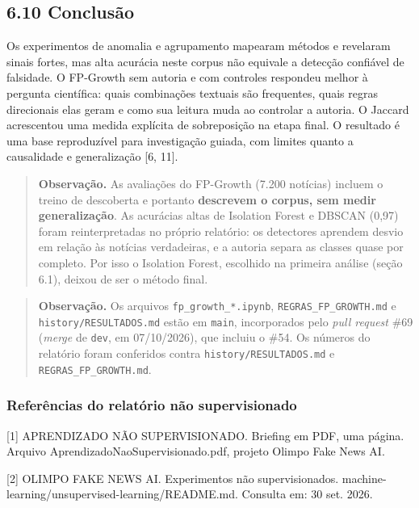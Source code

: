 \documentclass[
  brazilian,
  11pt,
]{article}
\begin{document}
\subsection{6.10 Conclusão}\label{conclusuxe3o}

Os experimentos de anomalia e agrupamento mapearam métodos e revelaram sinais fortes, mas alta acurácia neste corpus não equivale a detecção confiável de falsidade. O FP-Growth sem autoria e com controles respondeu melhor à pergunta científica: quais combinações textuais são frequentes, quais regras direcionais elas geram e como sua leitura muda ao controlar a autoria. O Jaccard acrescentou uma medida explícita de sobreposição na etapa final. O resultado é uma base reproduzível para investigação guiada, com limites quanto a causalidade e generalização {[}6, 11{]}.

\begin{quote}
\textbf{Observação.} As avaliações do FP-Growth (7.200 notícias) incluem o treino de descoberta e portanto \textbf{descrevem o corpus, sem medir generalização}. As acurácias altas de Isolation Forest e DBSCAN (0,97) foram reinterpretadas no próprio relatório: os detectores aprendem desvio em relação às notícias verdadeiras, e a autoria separa as classes quase por completo. Por isso o Isolation Forest, escolhido na primeira análise (seção 6.1), deixou de ser o método final.
\end{quote}

\begin{quote}
\textbf{Observação.} Os arquivos \texttt{fp\_growth\_*.ipynb}, \texttt{REGRAS\_FP\_GROWTH.md} e \texttt{history/RESULTADOS.md} estão em \texttt{main}, incorporados pelo \emph{pull request} \#69 (\emph{merge} de \texttt{dev}, em 07/10/2026), que incluiu o \#54. Os números do relatório foram conferidos contra \texttt{history/RESULTADOS.md} e \texttt{REGRAS\_FP\_GROWTH.md}.
\end{quote}

\subsubsection{Referências do relatório não supervisionado}\label{referuxeancias-do-relatuxf3rio-nuxe3o-supervisionado}

{[}1{]} APRENDIZADO NÃO SUPERVISIONADO. Briefing em PDF, uma página. Arquivo AprendizadoNaoSupervisionado.pdf, projeto Olimpo Fake News AI.

{[}2{]} OLIMPO FAKE NEWS AI. Experimentos não supervisionados. machine-learning/unsupervised-learning/README.md. Consulta em: 30 set. 2026.
\end{document}
